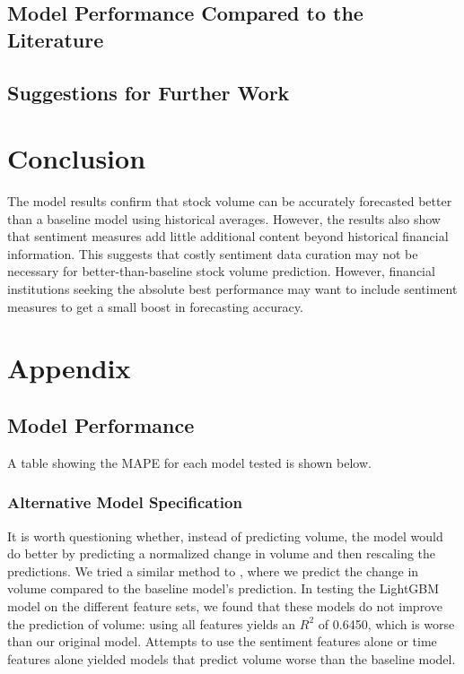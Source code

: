 \documentclass[12pt]{article}
\begin{document}
\subsection{Model Performance Compared to the Literature}
\subsection{Suggestions for Further Work}

\section{Conclusion}
\label{section:conclusion}
The model results confirm that stock volume can be accurately forecasted better than a baseline model using historical averages. However, the results also show that sentiment measures add little additional content beyond historical financial information. This suggests that costly sentiment data curation may not be necessary for better-than-baseline stock volume prediction. However, financial institutions seeking the absolute best performance may want to include sentiment measures to get a small boost in forecasting accuracy.

\newpage
\printbibliography
\newpage

\section{Appendix}
\subsection{Model Performance}
A table showing the MAPE for each model tested is shown below.


\subsubsection{Alternative Model Specification}
It is worth questioning whether, instead of predicting volume, the model would do better by predicting a normalized change in volume and then rescaling the predictions. We tried a similar method to \textcite{goyenko2024trading}, where we predict the change in volume compared to the baseline model's prediction. In testing the LightGBM model on the different feature sets, we found that these models do not improve the prediction of volume: using all features yields an $R^2$ of 0.6450, which is worse than our original model. Attempts to use the sentiment features alone or time features alone yielded models that predict volume worse than the baseline model.
\end{document}
